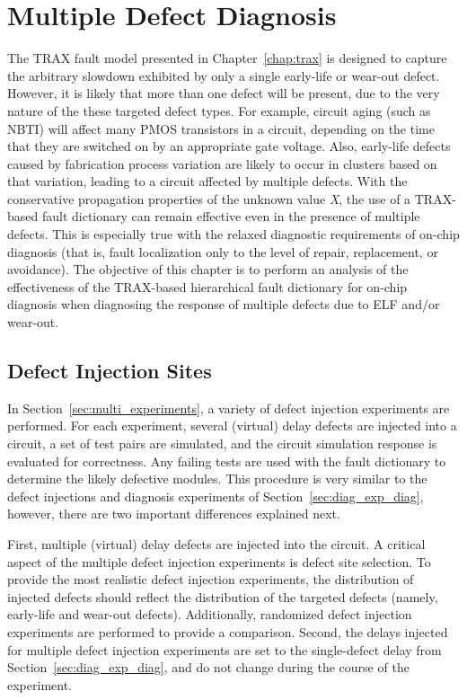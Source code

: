 \chapter{Multiple Defect Diagnosis}
\label{chap:multi}

The TRAX fault model presented in Chapter~\ref{chap:trax} is designed to capture the arbitrary slowdown exhibited by only a single early-life or wear-out defect.
%
However, it is likely that more than one defect will be present, due to the very nature of the these targeted defect types.
%
For example, circuit aging (such as NBTI) will affect many PMOS transistors in a circuit, depending on the time that they are switched on by an appropriate gate voltage.
%
Also, early-life defects caused by fabrication process variation are likely to occur in clusters based on that variation, leading to a circuit affected by multiple defects.
%
With the conservative propagation properties of the unknown value \textit{X}, the use of a TRAX-based fault dictionary can remain effective even in the presence of multiple defects.
%
This is especially true with the relaxed diagnostic requirements of on-chip diagnosis (that is, fault localization only to the level of repair, replacement, or avoidance).
%
The objective of this chapter is to perform an analysis of the effectiveness of the TRAX-based hierarchical fault dictionary for on-chip diagnosis when diagnosing the response of multiple defects due to ELF and/or wear-out.


\section{Defect Injection Sites}
\label{sec:multi_defect_injection_sites}

In Section~\ref{sec:multi_experiments}, a variety of defect injection experiments are performed.
%
For each experiment, several (virtual) delay defects are injected into a circuit, a set of test pairs are simulated, and the circuit simulation response is evaluated for correctness.
%
Any failing tests are used with the fault dictionary to determine the likely defective modules.
%
This procedure is very similar to the defect injections and diagnosis experiments of Section~\ref{sec:diag_exp_diag}, however, there are two important differences explained next.

First, multiple (virtual) delay defects are injected into the circuit.
%
A critical aspect of the multiple defect injection experiments is defect site selection.
%
To provide the most realistic defect injection experiments, the distribution of injected defects should reflect the distribution of the targeted defects (namely, early-life and wear-out defects).
%
Additionally, randomized defect injection experiments are performed to provide a comparison.
%
Second, the delays injected for multiple defect injection experiments are set to the single-defect delay from Section~\ref{sec:diag_exp_diag}, and do not change during the course of the experiment.

